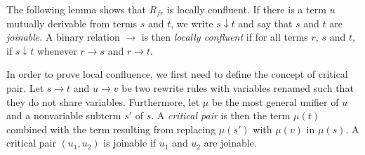 \documentclass[a4paper,twoside,openright]{report}
\begin{document}
The following lemma shows that $R_{fr}$ is locally confluent. If there is a term $u$ mutually derivable from terms $s$ and $t$, we write $s\downarrow t$ and say that $s$ and $t$ are \emph{joinable}. A binary relation $\to$ is then \emph{locally confluent} if for all terms $r$, $s$ and $t$, if $s\downarrow t$ whenever $r\to s$ and $r\to t$.

In order to prove local confluence, we first need to define the concept of critical pair. Let $s\to t$ and $u\to v$ be two rewrite rules with variables renamed such that they do not share variables. Furthermore, let $\mu$ be the most general unifier of $u$ and a nonvariable subterm $s'$ of $s$. A \emph{critical pair} is then the term $\mu(t)$ combined with the term resulting from replacing $\mu(s')$ with $\mu(v)$ in $\mu(s)$. A critical pair $(u_1, u_2)$ is joinable if $u_1$ and $u_2$ are joinable.
\end{document}
